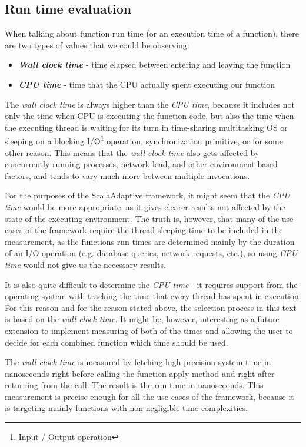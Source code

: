 \subsection{Run time evaluation}

When talking about function run time (or an execution time of a function), there are two types of values that we could be observing:

\begin{itemize}
	\item \textbf{\textit{Wall clock time}} - time elapsed between entering and leaving the function
	\item \textbf{\textit{CPU time}} - time that the CPU actually spent executing our function
\end{itemize}

The \textit{wall clock time} is always higher than the \textit{CPU time}, because it includes not only the time when CPU is executing the function code, but also the time when the executing thread is waiting for its turn in time-sharing multitasking OS or sleeping on a blocking I/O\footnote{Input / Output operation} operation, synchronization primitive, or for some other reason. This means that the \textit{wall clock time} also gets affected by concurrently running processes, network load, and other environment-based factors, and tends to vary much more between multiple invocations.

For the purposes of the ScalaAdaptive framework, it might seem that the \textit{CPU time} would be more appropriate, as it gives clearer results not affected by the state of the executing environment. The truth is, however, that many of the use cases of the framework require the thread sleeping time to be included in the measurement, as the functions run times are determined mainly by the duration of an I/O operation (e.g. database queries, network requests, etc.), so using \textit{CPU time} would not give us the necessary results.

It is also quite difficult to determine the \textit{CPU time} - it requires support from the operating system with tracking the time that every thread has spent in execution. For this reason and for the reason stated above, the selection process in this text is based on the \textit{wall clock time}. It might be, however, interesting as a future extension to implement measuring of both of the times and allowing the user to decide for each combined function which time should be used.

The \textit{wall clock time} is measured by fetching high-precision system time in nanoseconds right before calling the function apply method and right after returning from the call. The result is the run time in nanoseconds. This measurement is precise enough for all the use cases of the framework, because it is targeting mainly functions with non-negligible time complexities.

